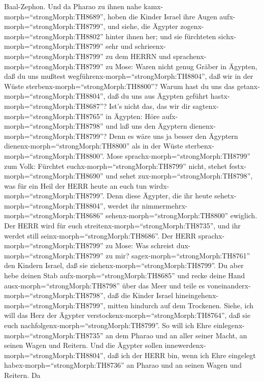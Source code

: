 Baal-Zephon.  Und da Pharao zu ihnen nahe
kamx-morph=``strongMorph:TH8689'', hoben die Kinder Israel ihre Augen
aufx-morph=``strongMorph:TH8799'', und siehe, die Ägypter
zogenx-morph=``strongMorph:TH8802'' hinter ihnen her; und sie fürchteten
sichx-morph=``strongMorph:TH8799'' sehr und
schrieenx-morph=``strongMorph:TH8799'' zu dem HERRN  und
sprachenx-morph=``strongMorph:TH8799'' zu Mose: Waren nicht genug Gräber
in Ägypten, daß du uns mußtest wegführenx-morph=``strongMorph:TH8804'',
daß wir in der Wüste sterbenx-morph=``strongMorph:TH8800''? Warum hast
du uns das getanx-morph=``strongMorph:TH8804'', daß du uns aus Ägypten
geführt hastx-morph=``strongMorph:TH8687''?  Ist's nicht
das, das wir dir sagtenx-morph=``strongMorph:TH8765'' in Ägypten: Höre
aufx-morph=``strongMorph:TH8798'' und laß uns den Ägyptern
dienenx-morph=``strongMorph:TH8799''? Denn es wäre uns ja besser den
Ägyptern dienenx-morph=``strongMorph:TH8800'' als in der Wüste
sterbenx-morph=``strongMorph:TH8800''.  Mose
sprachx-morph=``strongMorph:TH8799'' zum Volk: Fürchtet
euchx-morph=``strongMorph:TH8799'' nicht, stehet
festx-morph=``strongMorph:TH8690'' und sehet
zux-morph=``strongMorph:TH8798'', was für ein Heil der HERR heute an
euch tun wirdx-morph=``strongMorph:TH8799''. Denn diese Ägypter, die ihr
heute sehetx-morph=``strongMorph:TH8804'', werdet ihr
nimmermehrx-morph=``strongMorph:TH8686''
sehenx-morph=``strongMorph:TH8800'' ewiglich.  Der HERR
wird für euch streitenx-morph=``strongMorph:TH8735'', und ihr werdet
still seinx-morph=``strongMorph:TH8686''.  Der HERR
sprachx-morph=``strongMorph:TH8799'' zu Mose: Was schreist
dux-morph=``strongMorph:TH8799'' zu mir?
sagex-morph=``strongMorph:TH8761'' den Kindern Israel, daß sie
ziehenx-morph=``strongMorph:TH8799''.  Du aber hebe deinen
Stab aufx-morph=``strongMorph:TH8685'' und recke deine Hand
ausx-morph=``strongMorph:TH8798'' über das Meer und teile es
voneinanderx-morph=``strongMorph:TH8798'', daß die Kinder Israel
hineingehenx-morph=``strongMorph:TH8799'', mitten hindurch auf dem
Trockenen.  Siehe, ich will das Herz der Ägypter
verstockenx-morph=``strongMorph:TH8764'', daß sie euch
nachfolgenx-morph=``strongMorph:TH8799''. So will ich Ehre
einlegenx-morph=``strongMorph:TH8735'' an dem Pharao und an aller seiner
Macht, an seinen Wagen und Reitern.  Und die Ägypter sollen
innewerdenx-morph=``strongMorph:TH8804'', daß ich der HERR bin, wenn ich
Ehre eingelegt habex-morph=``strongMorph:TH8736'' an Pharao und an
seinen Wagen und Reitern.  Da
